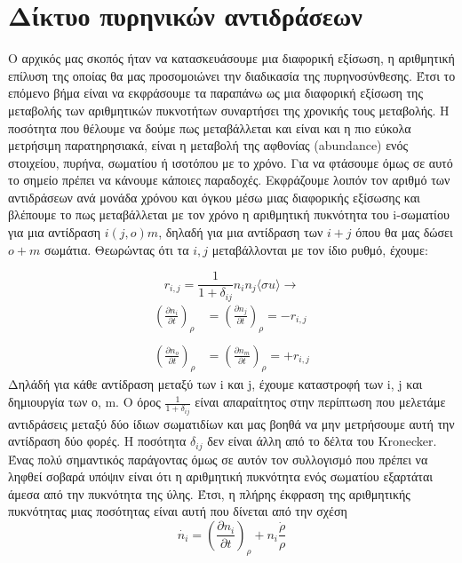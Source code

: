 \section{Δίκτυο πυρηνικών αντιδράσεων}
 Ο αρχικός μας σκοπός ήταν να κατασκευάσουμε μια διαφορική εξίσωση, η αριθμητική επίλυση της οποίας θα μας προσομοιώνει την διαδικασία της πυρηνοσύνθεσης. Έτσι το επόμενο βήμα είναι να εκφράσουμε τα παραπάνω ως μια διαφορική εξίσωση της μεταβολής των αριθμητικών πυκνοτήτων συναρτήσει της χρονικής τους μεταβολής. Η ποσότητα που θέλουμε να δούμε πως μεταβάλλεται και είναι και η πιο εύκολα μετρήσιμη παρατηρησιακά, είναι η μεταβολή της αφθονίας (abundance) ενός στοιχείου, πυρήνα, σωματίου ή ισοτόπου με το χρόνο. Για να φτάσουμε όμως σε αυτό το σημείο πρέπει να κάνουμε κάποιες παραδοχές. Εκφράζουμε λοιπόν τον αριθμό των αντιδράσεων ανά μονάδα χρόνου και όγκου μέσω μιας διαφορικής εξίσωσης και βλέπουμε το πως μεταβάλλεται με τον χρόνο η αριθμητική πυκνότητα του i-σωματίου για μια αντίδραση $i(j,o)m$, δηλαδή για μια αντίδραση των $i+j$ όπου θα μας δώσει $ o+m $ σωμάτια. Θεωρώντας ότι τα $i,j$ μεταβάλλονται με τον ίδιο ρυθμό, έχουμε:
 
\begin{equation}
\label{eq60}
r_{i,j}=\frac{1}{1+\delta_{ij}}n_{i}n_{j}\langle\sigma u \rangle \longrightarrow
\end{equation} 
\begin{align}
\label{eq61_62}
\left( \frac{\partial n_{i}}{\partial t} \right)_{\rho} &= \left( \frac{\partial n_{j}}{\partial t} \right)_{\rho}= -r_{i,j} \\ \nonumber \\
\left( \frac{\partial n_{o}}{\partial t} \right)_{\rho} &= \left( \frac{\partial n_{m}}{\partial t} \right)_{\rho}= +r_{i,j}
\end{align}
Δηλάδή για κάθε αντίδραση μεταξύ των i και j, έχουμε καταστροφή των i, j και δημιουργία των ο, m. Ο όρος $\displaystyle \frac{1}{1+\delta_{ij}}$ είναι απαραίτητος στην περίπτωση που μελετάμε αντιδράσεις μεταξύ δύο ίδιων σωματιδίων και μας βοηθά να μην μετρήσουμε αυτή την αντίδραση δύο φορές. Η ποσότητα $\delta_{ij}$ δεν είναι άλλη από το δέλτα του Κronecker. Ένας πολύ σημαντικός παράγοντας όμως σε αυτόν τον συλλογισμό που πρέπει να ληφθεί σοβαρά υπόψιν είναι ότι η αριθμητική πυκνότητα ενός σωματίου εξαρτάται άμεσα από την πυκνότητα της ύλης. Έτσι, η πλήρης έκφραση της αριθμητικής πυκνότητας μιας ποσότητας είναι αυτή που δίνεται από την σχέση
\begin{equation}
\label{eq63}
\dot{n_{i}}= \left( \frac{\partial n_{i}}{\partial t} \right)_{\rho} + n_{i}\frac{\dot{\rho}}{\rho}
\end{equation}


